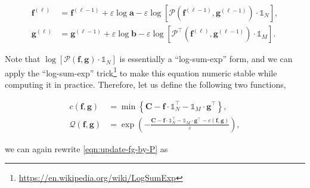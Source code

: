 \begin{equation}\label{eqn:update-fg-by-P}
  \begin{aligned}
    \mathbf{f}^{(\ell)}
     & = \mathbf{f}^{(\ell-1)} + \varepsilon\log \mathbf{a} -\varepsilon\log
    \left[
      \mathcal{P} \left(\mathbf{f}^{(\ell-1)}, \mathbf{g}^{(\ell-1)}\right)\cdot \mathbb{1}_N
    \right],                                                                 \\
    \mathbf{g}^{(\ell)}
     & = \mathbf{g}^{(\ell-1)} + \varepsilon\log \mathbf{b} -\varepsilon\log
    \left[
      \mathcal{P}^\top \left(\mathbf{f}^{(\ell)}, \mathbf{g}^{(\ell-1)}\right) \cdot \mathbb{1}_M
      \right].
  \end{aligned}
\end{equation}


Note that $\log \left[\mathcal{P}(\mathbf{f}, \mathbf{g})\cdot \mathbb{1}_N\right]$
is essentially a ``log-sum-exp'' form, and we can apply the ``log-sum-exp'' trick\footnote{
  \url{https://en.wikipedia.org/wiki/LogSumExp}
} to make this equation numeric stable while computing it in practice.
Therefore, let us define the following two functions,

\begin{equation}\label{eqn:function-c-and-Q}
  \begin{aligned}
    c \left(\mathbf{f}, \mathbf{g}\right)
     & = \min \left\{\mathbf{C} - \mathbf{f} \cdot \mathbb{1}_N^\top - \mathbb{1}_M \cdot \mathbf{g}^\top\right\}, \\
    \mathcal{Q} \left(\mathbf{f}, \mathbf{g}\right)
     & = \exp \left(
    - \frac{
      \mathbf{C} - \mathbf{f} \cdot \mathbb{1}_N^\top - \mathbb{1}_M \cdot \mathbf{g}^\top
      - c \left(\mathbf{f}, \mathbf{g}\right)
    }{\varepsilon}
    \right),
  \end{aligned}
\end{equation}


we can again rewrite \cref{eqn:update-fg-by-P} as

